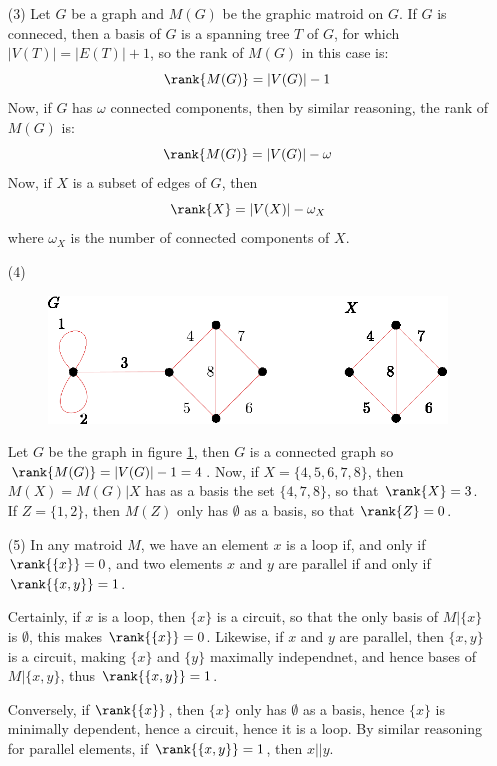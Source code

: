 \begin{example}
\begin{enumerate}
    \item[(3)] Let $G$ be a graph and $M(G)$ be the graphic matroid on $G$. If
        $G$ is conneced, then a basis of  $G$ is a spanning tree  $T$ of  $G$,
        for which  $|V(T)|=|E(T)|+1$, so the rank of $M(G)$ in this case is:
        \begin{equation*}
            \rank{M(G)}=|V(G)|-1
        \end{equation*}
        Now, if $G$ has  $\omega$ connected components, then by similar
        reasoning, the rank of  $M(G)$ is:
        \begin{equation*}
            \rank{M(G)}=|V(G)|-\omega
        \end{equation*}
        Now, if $X$ is a subset of edges of  $G$, then
        \begin{equation*}
            \rank{X}=|V(X)|-\omega_X
        \end{equation*}
        where  $\omega_X$ is the number of connected components of  $X$.

    \item[(4)]
         \begin{figure}[h]
            \centering
            \includegraphics[scale=1.0]{Figures/chapter1/connected_graph_rank.eps}
            \caption{}
            \label{fig_1.6}
        \end{figure}
        Let $G$ be the graph in figure \ref{fig_1.6}, then $G$ is a connected
        graph so  $\rank{M(G)}=|V(G)|-1=4$. Now, if $X=\{4,5,6,7,8\}$, then
        $M(X)=M(G)|X$ has as a basis the set $\{4,7,8\}$, so that $\rank{X}=3$.
        If $Z=\{1,2\}$, then $M(Z)$ only has $\emptyset$ as a basis, so that
        $\rank{Z}=0$.

    \item[(5)] In any matroid $M$, we have an element $x$ is a loop if, and only
        if  $\rank{\{x\}}=0$, and two elements $x$ and $y$ are parallel if and
        only if $\rank{\{x,y\}}=1$.

        Certainly, if $x$ is a loop, then  $\{x\}$ is a circuit, so that the
        only basis of $M|\{x\}$ is $\emptyset$, this makes  $\rank{\{x\}}=0$.
        Likewise, if $x$ and  $y$ are parallel, then $\{x,y\}$ is a circuit,
        making $\{x\}$ and $\{y\}$ maximally independnet, and hence bases of
        $M|\{x,y\}$, thus $\rank{\{x,y\}}=1$.

        Conversely, if $\rank{\{x\}}$, then $\{x\}$ only has $\emptyset$ as a
        basis, hence $\{x\}$ is minimally dependent, hence a circuit, hence it
        is a loop. By similar reasoning for parallel elements, if
        $\rank{\{x,y\}}=1$, then $x || y$.
    \end{enumerate}
\end{example}

